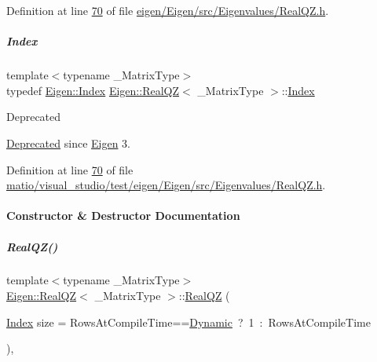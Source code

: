Definition at line \hyperlink{eigen_2_eigen_2src_2_eigenvalues_2_real_q_z_8h_source_l00070}{70} of file \hyperlink{eigen_2_eigen_2src_2_eigenvalues_2_real_q_z_8h_source}{eigen/\+Eigen/src/\+Eigenvalues/\+Real\+Q\+Z.\+h}.

\mbox{\label{group___eigenvalues___module_a6201e534e901b5f4e66f72c176b534a3}} 
\subparagraph{\texorpdfstring{Index}{Index}\hspace{0.1cm}{\footnotesize\ttfamily [2/2]}}
{\footnotesize\ttfamily template$<$typename \+\_\+\+Matrix\+Type$>$ \\
typedef \hyperlink{namespace_eigen_a62e77e0933482dafde8fe197d9a2cfde}{Eigen\+::\+Index} \hyperlink{group___eigenvalues___module_class_eigen_1_1_real_q_z}{Eigen\+::\+Real\+QZ}$<$ \+\_\+\+Matrix\+Type $>$\+::\hyperlink{group___eigenvalues___module_a6201e534e901b5f4e66f72c176b534a3}{Index}}

\begin{DoxyRefDesc}{Deprecated}
\item[\hyperlink{deprecated__deprecated000065}{Deprecated}]since \hyperlink{namespace_eigen}{Eigen} 3. \end{DoxyRefDesc}


Definition at line \hyperlink{matio_2visual__studio_2test_2eigen_2_eigen_2src_2_eigenvalues_2_real_q_z_8h_source_l00070}{70} of file \hyperlink{matio_2visual__studio_2test_2eigen_2_eigen_2src_2_eigenvalues_2_real_q_z_8h_source}{matio/visual\+\_\+studio/test/eigen/\+Eigen/src/\+Eigenvalues/\+Real\+Q\+Z.\+h}.



\paragraph{Constructor \& Destructor Documentation}
\mbox{\label{group___eigenvalues___module_ad8fb9235870a8361a2fdd8dcc2e80d01}} 
\subparagraph{\texorpdfstring{Real\+Q\+Z()}{RealQZ()}\hspace{0.1cm}{\footnotesize\ttfamily [1/4]}}
{\footnotesize\ttfamily template$<$typename \+\_\+\+Matrix\+Type$>$ \\
\hyperlink{group___eigenvalues___module_class_eigen_1_1_real_q_z}{Eigen\+::\+Real\+QZ}$<$ \+\_\+\+Matrix\+Type $>$\+::\hyperlink{group___eigenvalues___module_class_eigen_1_1_real_q_z}{Real\+QZ} (\begin{DoxyParamCaption}\item[{\hyperlink{group___eigenvalues___module_a6201e534e901b5f4e66f72c176b534a3}{Index}}]{size = {\ttfamily RowsAtCompileTime==\hyperlink{namespace_eigen_ad81fa7195215a0ce30017dfac309f0b2}{Dynamic}~?~1~\+:~RowsAtCompileTime} }\end{DoxyParamCaption})\hspace{0.3cm}{\ttfamily [inline]}, {\ttfamily [explicit]}}



